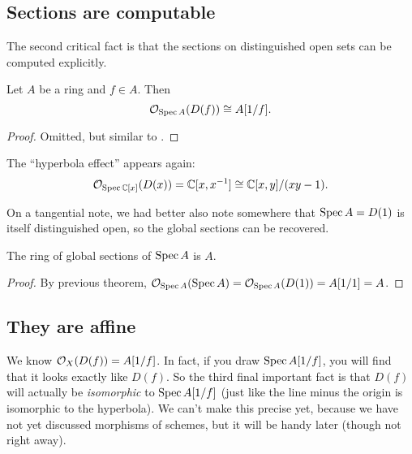 \subsection{Sections are computable}
The second critical fact is that the sections
on distinguished open sets can be computed explicitly.
\begin{theorem}
	Let $A$ be a ring and $f \in A$.
	Then \[ \mathcal O_{\operatorname{Spec} A}(D(f)) \cong A[1/f]. \]
\end{theorem}
\begin{proof}
	Omitted, but similar to
	.
\end{proof}

\begin{example}
	The ``hyperbola effect'' appears again:
	\[ \mathcal O_{\operatorname{Spec} \mathbb C[x]} (D(x))
		= \mathbb C[x, x^{-1}]
		\cong \mathbb C[x,y] / (xy-1). \]
\end{example}

On a tangential note,
we had better also note somewhere that $\operatorname{Spec} A = D(1)$
is itself distinguished open, so the global sections can be recovered.
\begin{corollary}
	The ring of global sections of $\operatorname{Spec} A$ is $A$.
\end{corollary}
\begin{proof}
	By previous theorem, $\mathcal O_{\operatorname{Spec} A}(\operatorname{Spec} A)
	= \mathcal O_{\operatorname{Spec} A}(D(1)) = A[1/1] = A$.
\end{proof}

\subsection{They are affine}
\label{subsec:distinguished_open_affine}
We know $\mathcal O_X(D(f)) = A[1/f]$.
In fact, if you draw $\operatorname{Spec} A[1/f]$,
you will find that it looks exactly like $D(f)$.
So the third final important fact is that
$D(f)$ will actually be \emph{isomorphic} to $\operatorname{Spec} A[1/f]$
(just like the line minus the origin is isomorphic to the hyperbola).
We can't make this precise yet,
because we have not yet discussed morphisms of schemes,
but it will be handy later (though not right away).

